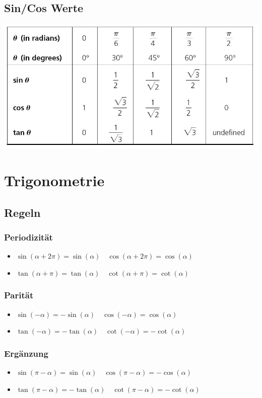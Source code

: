 \documentclass[8pt]{article}
\begin{document}
\begin{multicols*}{3}
\subsection{Sin/Cos Werte}
\begin{center}
\includegraphics[scale=0.3]{values.png}
\end{center}


\section{Trigonometrie}

\subsection{Regeln}
\subsubsection{Periodizität}
\begin{itemize}
 \item $\sin(\alpha + 2 \pi) = \sin(\alpha) \quad \cos(\alpha + 2 \pi) = \cos(\alpha)$
 \item $\tan(\alpha + \pi) = \tan(\alpha) \quad \cot(\alpha + \pi) = \cot(\alpha)$
\end{itemize}

\subsubsection{Parität}
\begin{itemize}
 \item $\sin(-\alpha) = - \sin(\alpha) \quad \cos(-\alpha) = \cos(\alpha)$
 \item $\tan(-\alpha) = - \tan(\alpha) \quad \cot(-\alpha) = - \cot(\alpha)$
\end{itemize}

\subsubsection{Ergänzung}
\begin{itemize}
 \item $\sin(\pi - \alpha) = \sin(\alpha) \quad \cos(\pi - \alpha) = - \cos(\alpha)$
 \item $\tan(\pi - \alpha) = -\tan(\alpha) \quad \cot(\pi - \alpha) = - \cot(\alpha)$
\end{itemize}



\end{multicols*}
\end{document}
